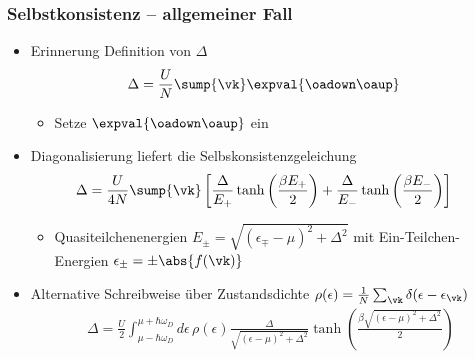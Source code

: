 \begin{frame}
    \frametitle{Selbstkonsistenz -- allgemeiner Fall}
    \begin{itemize}
        \item Erinnerung Definition von $\Delta$
        \begin{align*}
            \Delta &= \frac{U}{N}\sump{\vk} \expval{\oadown \oaup}
        \end{align*}
        \begin{itemize}
            \item[$\rightarrow$] Setze $\expval{\oadown \oaup}$ ein
        \end{itemize}
        \item Diagonalisierung liefert die Selbskonsistenzgeleichung 
        \begin{align*}
            \Delta &= \frac{U}{4N} \sump{\vk} \left[\frac{\Delta}{E_+} \tanh\left(\frac{\beta E_+}{2}\right) + \frac{\Delta}{E_-} \tanh\left(\frac{\beta E_-}{2}\right)\right]
        \end{align*}
        \begin{itemize}
            \item[$\rightarrow$] Quasiteilchenenergien $E_\pm = \sqrt{(\epsilon_{\mp} - \mu)^2 + \Delta^2}$ mit Ein-Teilchen-Energien $\epsilon_\pm = \pm \abs{f(\vk)}$ 
        \end{itemize}
        \pause
        \item Alternative Schreibweise über Zustandsdichte $\rho(\epsilon) = \frac{1}{N} \sum_{\vk} \delta(\epsilon - \epsilon_\vk)$
        \begin{align*}
            \Delta = \frac{U}{2} \int_{\mu -\hbar \omega_D}^{\mu + \hbar \omega_D} d\epsilon \, \rho(\epsilon) \frac{\Delta}{\sqrt{(\epsilon - \mu)^2 + \Delta^2}} \tanh\left(\frac{\beta \sqrt{(\epsilon - \mu)^2 + \Delta^2}}{2}\right)
        \end{align*}
    \end{itemize}
\end{frame}

